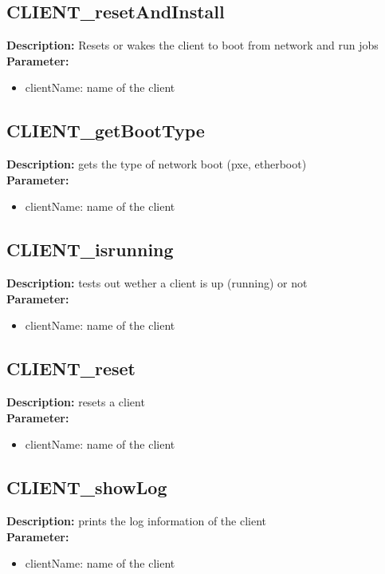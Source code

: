 \subsection{CLIENT\_resetAndInstall}
\textbf{Description:} Resets or wakes the client to boot from network and run jobs\\
\textbf{Parameter:}
\begin{itemize}
\item clientName: name of the client
\end{itemize}

\subsection{CLIENT\_getBootType}
\textbf{Description:} gets the type of network boot (pxe, etherboot)\\
\textbf{Parameter:}
\begin{itemize}
\item clientName: name of the client
\end{itemize}

\subsection{CLIENT\_isrunning}
\textbf{Description:} tests out wether a client is up (running) or not\\
\textbf{Parameter:}
\begin{itemize}
\item clientName: name of the client
\end{itemize}

\subsection{CLIENT\_reset}
\textbf{Description:} resets a client\\
\textbf{Parameter:}
\begin{itemize}
\item clientName: name of the client
\end{itemize}

\subsection{CLIENT\_showLog}
\textbf{Description:} prints the log information of the client\\
\textbf{Parameter:}
\begin{itemize}
\item clientName: name of the client
\end{itemize}

